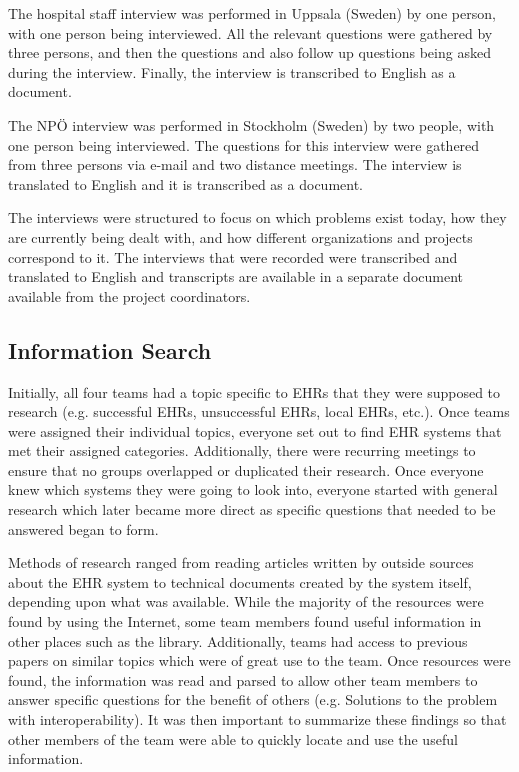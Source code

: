 \documentclass[14pt]{article}
\begin{document}
The hospital staff interview \cite{FarzinYazdi} was performed in Uppsala (Sweden) by one person, with one person being interviewed. All the relevant questions were gathered by three persons, and then the questions and also follow up questions being asked during the interview. Finally, the interview is transcribed to English as a document. 

The NPÖ interview \cite{ViktorJernelov} was performed in Stockholm (Sweden) by two people, with one person being interviewed. The questions for this interview were gathered from three persons via e-mail and two distance meetings. The interview is translated to English and it is transcribed as a document.

The interviews were structured to focus on which problems exist today, how they are currently being dealt with, and how different organizations and projects correspond to it. The interviews that were recorded were transcribed and translated to English and transcripts are available in a separate document available from the project coordinators.

\subsection{Information Search}
Initially, all four teams had a topic specific to \glspl{EHR} that they were supposed to research (e.g. successful \glspl{EHR}, unsuccessful \glspl{EHR}, local \glspl{EHR}, etc.). Once teams were assigned their individual topics, everyone set out to find \gls{EHR} systems that met their assigned categories. Additionally, there were recurring meetings to ensure that no groups overlapped or duplicated their research. Once everyone knew which systems they were going to look into, everyone started with general research which later became more direct as specific questions that needed to be answered began to form.

Methods of research ranged from reading articles written by outside sources about the \gls{EHR} system to technical documents created by the system itself, depending upon what was available.  While the majority of the resources were found by using the Internet, some team members found useful information in other places such as the library.  Additionally, teams had access to previous papers on similar topics which were of great use to the team.  Once resources were found, the information was read and parsed to allow other team members to answer specific questions for the benefit of others (e.g. Solutions to the problem with interoperability).  It was then important to summarize these findings so that other members of the team were able to quickly locate and use the useful information.
\end{document}

